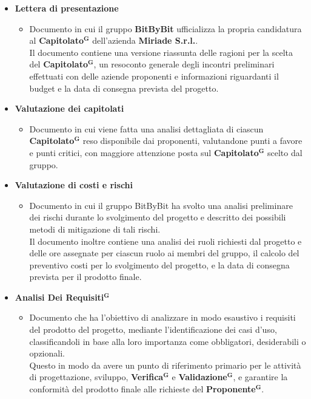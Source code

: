 \documentclass[a4paper,12pt]{article}
\newcommand{\term}[1]{\textbf{#1}$^\mathbf{G}$}
\begin{document}
\begin{itemize}
    \item \textbf{Lettera di presentazione}
    \begin{itemize}
        \item Documento in cui il gruppo \textbf{BitByBit} ufficializza la propria candidatura al \term{Capitolato} dell’azienda \textbf{Miriade S.r.l.}.
        \\Il documento contiene una versione riassunta delle ragioni per la scelta del \term{Capitolato}, un resoconto generale degli incontri preliminari effettuati con delle aziende proponenti e informazioni riguardanti il budget e la data di consegna prevista del progetto.
    \end{itemize}
    
    \item \textbf{Valutazione dei capitolati}
    \begin{itemize}
        \item Documento in cui viene fatta una analisi dettagliata di ciascun \term{Capitolato} reso disponibile dai proponenti, valutandone punti a favore e punti critici, con maggiore attenzione posta sul \term{Capitolato} scelto dal gruppo.
    \end{itemize}

    \item \textbf{Valutazione di costi e rischi}
    \begin{itemize}
        \item Documento in cui il gruppo BitByBit ha svolto una analisi preliminare dei rischi durante lo svolgimento del progetto e descritto dei possibili metodi di mitigazione di tali rischi.
        \\Il documento inoltre contiene una analisi dei ruoli richiesti dal progetto e delle ore assegnate per ciascun ruolo ai membri del gruppo, il calcolo del preventivo costi per lo svolgimento del progetto, e la data di consegna prevista per il prodotto finale.

    \end{itemize}

    \item \textbf{\term{Analisi Dei Requisiti}}
    \begin{itemize}
        \item Documento che ha l’obiettivo di analizzare in modo esaustivo i requisiti del prodotto del progetto, mediante l’identificazione dei casi d’uso, classificandoli in base alla loro importanza come obbligatori, desiderabili o opzionali. 
        \\Questo in modo da avere un punto di riferimento primario per le attività di progettazione, sviluppo, \term{Verifica} e \term{Validazione}, e garantire la conformità del prodotto finale alle richieste del \term{Proponente}.
    \end{itemize}


\end{itemize}
\end{document}
